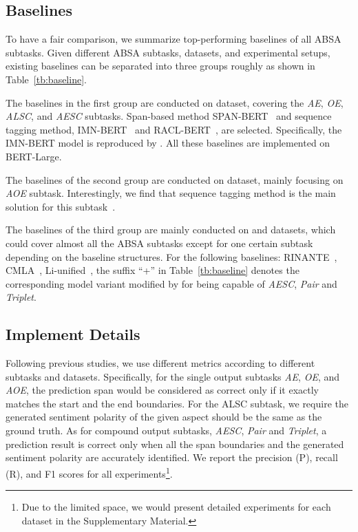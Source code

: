 \documentclass[11pt,a4paper]{article}
\begin{document}
\subsection{Baselines}
To have a fair comparison, we summarize top-performing baselines of all ABSA subtasks. Given different ABSA subtasks, datasets, and experimental setups, existing baselines can be separated into three groups roughly as shown in Table~\ref{tb:baseline}.

The baselines in the first group are conducted on \emph{} dataset, covering the \emph{AE}, \emph{OE}, \emph{ALSC}, and \emph{AESC}  subtasks. Span-based method SPAN-BERT~\citep{DBLP:conf/acl/HuPHLL19} and sequence tagging method, IMN-BERT~\citep{DBLP:conf/acl/HeLND19} and RACL-BERT~\citep{DBLP:conf/acl/ChenQ20}, are selected. Specifically, the IMN-BERT model is  reproduced by \citet{DBLP:conf/acl/ChenQ20}. All these baselines are implemented on BERT-Large.


The baselines of the second group are conducted on \emph{} dataset, mainly focusing on \emph{AOE}  subtask. Interestingly, we find that sequence tagging method is the main solution for this subtask~\citep{DBLP:conf/naacl/FanWDHC19,DBLP:conf/aaai/WuZDHC20,DBLP:conf/emnlp/VeysehNDDN20}.

The baselines of the third group are mainly conducted on \emph{} and \emph{} datasets, which could  cover almost all the  ABSA subtasks except for one certain subtask depending on the baseline structures.   For the following baselines: RINANTE~\citep{DBLP:conf/acl/DaiS19}, CMLA~\citep{DBLP:conf/aaai/WangPDX17}, Li-unified~\citep{DBLP:conf/aaai/LiBLL19}, the suffix ``+'' in  Table~\ref{tb:baseline}  denotes the corresponding model variant  modified by \citet{DBLP:conf/aaai/PengXBHLS20} for being capable of \emph{AESC},  \emph{Pair}  and \emph{Triplet}.









\subsection{Implement Details}
Following previous studies, we use different metrics according to different subtasks and datasets. Specifically, for the single output subtasks \emph{AE}, \emph{OE}, and \emph{AOE}, the prediction span would be considered  as correct only if it exactly matches the start and the end boundaries. For the ALSC subtask, we require the generated sentiment polarity of the given aspect should be the same as the ground truth. As for compound output subtasks, \emph{AESC}, \emph{Pair} and \emph{Triplet}, a prediction result is correct only when  all the span boundaries and the generated sentiment polarity are  accurately identified. We report the precision (P), recall (R), and F1 scores for all experiments\footnote{Due to the limited space, we would present detailed experiments for each dataset in the Supplementary Material.}.
\end{document}
